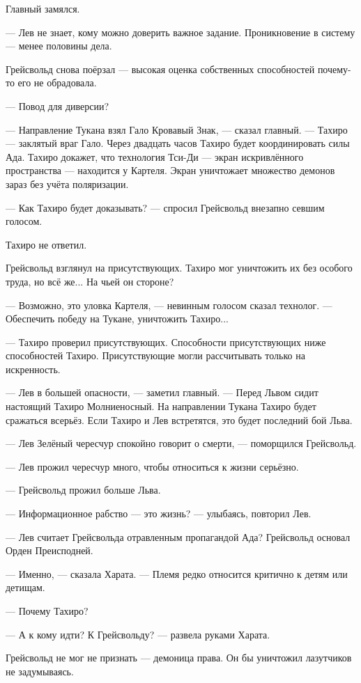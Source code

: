 Главный замялся.

--- Лев не знает, кому можно доверить важное задание.
Проникновение в систему --- менее половины дела.

Грейсвольд снова поёрзал --- высокая оценка собственных способностей почему-то его не обрадовала.

--- Повод для диверсии?

--- Направление Тукана взял Гало Кровавый Знак, --- сказал главный.
--- Тахиро --- заклятый враг Гало.
Через двадцать часов Тахиро будет координировать силы Ада.
Тахиро докажет, что технология Тси-Ди --- экран искривлённого пространства --- находится у Картеля.
Экран уничтожает множество демонов зараз без учёта поляризации.

--- Как Тахиро будет доказывать? --- спросил Грейсвольд внезапно севшим голосом.

Тахиро не ответил.

Грейсвольд взглянул на присутствующих.
Тахиро мог уничтожить их без особого труда, но всё же...
На чьей он стороне?

--- Возможно, это уловка Картеля, --- невинным голосом сказал технолог.
--- Обеспечить победу на Тукане, уничтожить Тахиро...

--- Тахиро проверил присутствующих.
Способности присутствующих ниже способностей Тахиро.
Присутствующие могли рассчитывать только на искренность.

--- Лев в большей опасности, --- заметил главный.
--- Перед Львом сидит настоящий Тахиро Молниеносный.
На направлении Тукана Тахиро будет сражаться всерьёз.
Если Тахиро и Лев встретятся, это будет последний бой Льва.

--- Лев Зелёный чересчур спокойно говорит о смерти, --- поморщился Грейсвольд.

--- Лев прожил чересчур много, чтобы относиться к жизни серьёзно.

--- Грейсвольд прожил больше Льва.

--- Информационное рабство --- это жизнь? --- улыбаясь, повторил Лев.

--- Лев считает Грейсвольда отравленным пропагандой Ада?
Грейсвольд основал Орден Преисподней.

--- Именно, --- сказала Харата.
--- Племя редко относится критично к детям или детищам.

--- Почему Тахиро?

--- А к кому идти?
К Грейсвольду? --- развела руками Харата.

Грейсвольд не мог не признать --- демоница права.
Он бы уничтожил лазутчиков не задумываясь.

